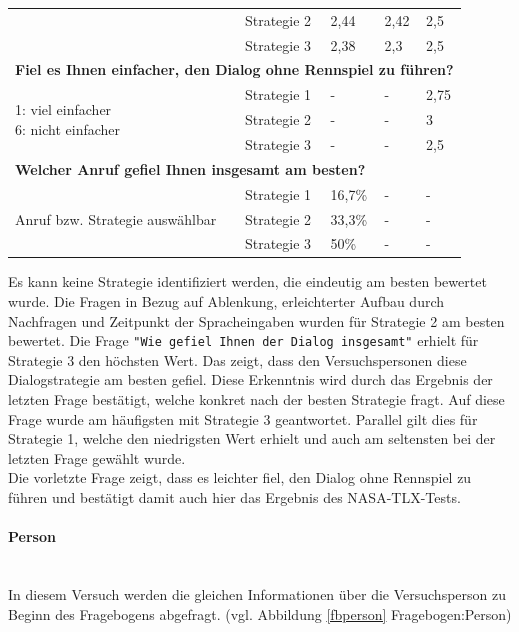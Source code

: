 \documentclass[12pt,a4paper]{scrartcl}
\begin{document}
\begin{longtable}{|p{4cm}|p{2cm}|p{2cm}|p{2cm}|p{2cm}|}
 & Strategie 2 & 2,44 & 2,42 & 2,5 \\
 & Strategie 3 & 2,38 & 2,3 & 2,5 \\
\hline
		\multicolumn{5}{l}{\textbf{Fiel es Ihnen einfacher, den Dialog ohne Rennspiel zu führen?}}\\
		\hline
\multirow{3}{4cm}{1: viel einfacher \newline  6: nicht einfacher} & Strategie 1 & - & - & 2,75 \\
- & Strategie 2 & - & - & 3 \\
- & Strategie 3 & - & - & 2,5\\
\hline
		\multicolumn{5}{l}{\textbf{Welcher Anruf gefiel Ihnen insgesamt am besten?}}\\
		\hline
\multirow{3}{4cm}{Anruf bzw. Strategie auswählbar} & Strategie 1 & 16,7\% &-  &-  \\
 & Strategie 2 & 33,3\% & - & - \\
 & Strategie 3 & 50\% & - &  -\\
\hline
\end{longtable}

Es kann keine Strategie identifiziert werden, die eindeutig am besten bewertet wurde. 
Die Fragen in Bezug auf Ablenkung, erleichterter Aufbau durch Nachfragen und Zeitpunkt der Spracheingaben wurden für Strategie 2 am besten bewertet.
Die Frage \texttt{"Wie gefiel Ihnen der Dialog insgesamt"} erhielt für Strategie 3 den höchsten Wert. Das zeigt, dass den Versuchspersonen diese Dialogstrategie am besten gefiel. Diese Erkenntnis wird durch das Ergebnis der letzten Frage bestätigt, welche konkret nach der besten Strategie fragt. Auf diese Frage wurde am häufigsten mit Strategie 3 geantwortet. Parallel gilt dies für Strategie 1, welche den niedrigsten Wert erhielt und auch am seltensten bei der letzten Frage gewählt wurde. \\

Die vorletzte Frage zeigt, dass es leichter fiel, den Dialog ohne Rennspiel zu führen und bestätigt damit auch hier das Ergebnis des NASA-TLX-Tests.

\paragraph{Person}
\label{fbperson2}
~\\
In diesem Versuch werden die gleichen Informationen über die Versuchsperson zu Beginn des Fragebogens abgefragt. (vgl. Abbildung \ref{fbperson}  Fragebogen:Person)\\
\end{document}
